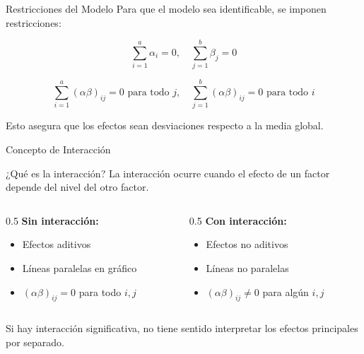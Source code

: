 \documentclass[aspectratio=169]{beamer}
\begin{document}
\begin{frame}{Restricciones del Modelo}
Para que el modelo sea identificable, se imponen restricciones:

$$\sum_{i=1}^{a} \alpha_i = 0, \quad \sum_{j=1}^{b} \beta_j = 0$$

$$\sum_{i=1}^{a} (\alpha\beta)_{ij} = 0 \text{ para todo } j, \quad \sum_{j=1}^{b} (\alpha\beta)_{ij} = 0 \text{ para todo } i$$

\vspace{0.3cm}
Esto asegura que los efectos sean desviaciones respecto a la media global.
\end{frame}

\begin{frame}{Concepto de Interacción}
\begin{block}{¿Qué es la interacción?}
La interacción ocurre cuando el efecto de un factor depende del nivel del otro factor.
\end{block}

\begin{columns}
\begin{column}{0.5\textwidth}
\textbf{Sin interacción:}
\begin{itemize}
\item Efectos aditivos
\item Líneas paralelas en gráfico
\item $(\alpha\beta)_{ij} = 0$ para todo $i,j$
\end{itemize}
\end{column}
\begin{column}{0.5\textwidth}
\textbf{Con interacción:}
\begin{itemize}
\item Efectos no aditivos
\item Líneas no paralelas
\item $(\alpha\beta)_{ij} \neq 0$ para algún $i,j$
\end{itemize}
\end{column}
\end{columns}

\vspace{0.3cm}
Si hay interacción significativa, no tiene sentido interpretar los efectos principales por separado.
\end{frame}
\end{document}

